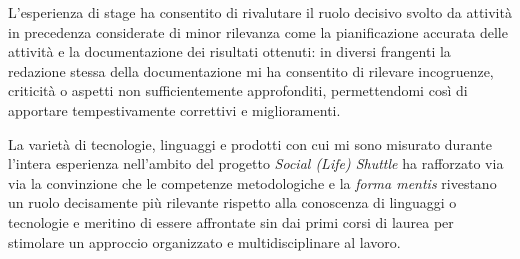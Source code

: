 L'esperienza di stage ha consentito di rivalutare il ruolo decisivo svolto da attività in precedenza considerate di minor rilevanza come la pianificazione accurata delle attività e la documentazione dei risultati ottenuti: in diversi frangenti la redazione stessa della documentazione mi ha consentito di rilevare incogruenze, criticità o aspetti non sufficientemente approfonditi, permettendomi così di apportare tempestivamente correttivi e miglioramenti.

La varietà di tecnologie, linguaggi e prodotti con cui mi sono misurato durante l'intera esperienza nell'ambito del progetto \textit{Social (Life) Shuttle} ha rafforzato via via la convinzione che le competenze metodologiche e la \textit{forma mentis} rivestano un ruolo decisamente più rilevante rispetto alla conoscenza di linguaggi o tecnologie e meritino di essere affrontate sin dai primi corsi di laurea per stimolare un approccio organizzato e multidisciplinare al lavoro.
